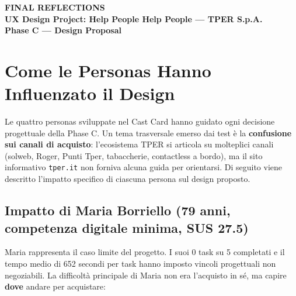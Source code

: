 \documentclass[11pt,a4paper]{article}
\begin{document}
\begin{tcolorbox}[colback=primaryColor,colframe=primaryColor,arc=3mm,halign=center,valign=center,height=2.5cm]
    \color{white}\LARGE\bfseries FINAL REFLECTIONS \\[0.2cm]
    \color{white!80}\large UX Design Project: Help People Help People --- TPER S.p.A. \\[0.1cm]
    \color{white!60}\normalsize Phase C --- Design Proposal
\end{tcolorbox}

\vspace{0.5cm}

\section{Come le Personas Hanno Influenzato il Design}

Le quattro personas sviluppate nel Cast Card hanno guidato ogni decisione progettuale della Phase C. Un tema trasversale emerso dai test \`e la \textbf{confusione sui canali di acquisto}: l'ecosistema TPER si articola su molteplici canali (solweb, Roger, Punti Tper, tabaccherie, contactless a bordo), ma il sito informativo \texttt{tper.it} non forniva alcuna guida per orientarsi. Di seguito viene descritto l'impatto specifico di ciascuna persona sul design proposto.

\subsection{Impatto di Maria Borriello (79 anni, competenza digitale minima, SUS 27.5)}

Maria rappresenta il caso limite del progetto. I suoi 0 task su 5 completati e il tempo medio di 652 secondi per task hanno imposto vincoli progettuali non negoziabili. La difficolt\`a principale di Maria non era l'acquisto in s\'e, ma capire \textbf{dove} andare per acquistare:
\end{document}
